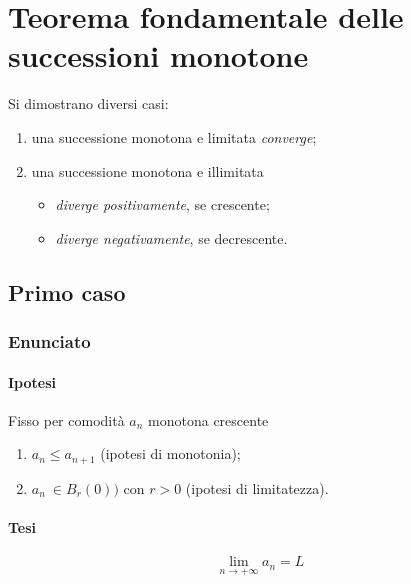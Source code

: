 \documentclass[../../dimostrazioni]{subfiles}
\begin{document}
    \chapter{Teorema fondamentale delle successioni monotone}

        Si dimostrano diversi casi:
        \begin{enumerate}
            \indentitem \item una successione monotona e limitata \emph{converge};
            \indentitem \item una successione monotona e illimitata
                \begin{itemize}
                    \indentitem \item \emph{diverge positivamente}, se crescente;
                    \indentitem \item \emph{diverge negativamente}, se decrescente.
                \end{itemize}
        \end{enumerate}            


        \section*{Primo caso}
            
            \subsection*{Enunciato}
                
                \subsubsection*{Ipotesi}
                         
                Fisso per comodità \(a_n\) monotona crescente

                \begin{enumerate}
                    \indentitem \item \(a_n \leqslant a_{n+1}\) (ipotesi di monotonia);
                    \indentitem \item \(a_n\ \in B_r(0))\) con \(r > 0 \) (ipotesi di limitatezza).
                \end{enumerate}
                
                \subsubsection*{Tesi}
                    \[\lim_{n \to +\infty} a_n = L\]
            
\end{document}
